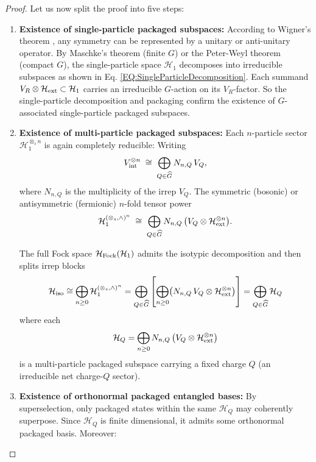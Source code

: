 \documentclass[12pt,a4paper]{article}
\begin{document}
\begin{proof}
	Let us now split the proof into five steps:
	
	\begin{enumerate}
		\item \textbf{Existence of single-particle packaged subspaces:}  
		According to Wigner's theorem \cite{Wigner1931}, any symmetry can be represented by a unitary or anti-unitary operator.
		By Maschke’s theorem (finite $G$) or the Peter-Weyl theorem (compact $G$), the single-particle space $\mathcal H_1$ decomposes into irreducible subspaces as shown in Eq. \eqref{EQ:SingleParticleDecomposition}.		
		Each summand $V_R \otimes \mathcal{H}_{\rm ext} \subset \mathcal H_1$ carries an irreducible $G$-action on its $V_R$-factor.
		So the single-particle decomposition and packaging confirm the existence of $G$-associated single-particle packaged subspaces.
		
		\item \textbf{Existence of multi-particle packaged subspaces:}		
		Each $n$-particle sector $\mathcal H_1^{\otimes_s n}$ is again completely reducible:
		Writing
		\[
		V_{\rm int}^{\otimes n}
		\;\cong\;
		\bigoplus_{Q\in\widehat G} N_{n,Q}\,V_Q,
		\]
		where $N_{n,Q}$ is the multiplicity of the irrep $V_Q$.
		The symmetric (bosonic) or antisymmetric (fermionic) $n$-fold tensor power
		\[
		\mathcal H_1^{(\otimes_s,\wedge)^n}
		\;\cong\;
		\bigoplus_{Q\in\widehat G}
		N_{n,Q}\,\bigl(V_Q\otimes\mathcal H_{\rm ext}^{\otimes n}\bigr).
		\]	
		
		The full Fock space $\mathcal{H}_{\rm Fock}(\mathcal H_1)$ admits the isotypic decomposition and then splits irrep blocks		
		\[
		\mathcal{H}_{\rm iso}
		\cong
		\bigoplus_{n \ge 0} \mathcal H_1^{(\otimes_s, \wedge)^n}
		= \bigoplus_{Q \in \widehat G}
		\left[\bigoplus_{n \ge 0} \bigl(N_{n,Q}\,V_Q \otimes \mathcal H_{\rm ext}^{\otimes n}\bigr) \right]
		= \bigoplus_{Q \in \widehat G} \mathcal{H}_Q
		\]
		where each
		\[
		\mathcal H_Q
		=
		\bigoplus_{n\ge0}N_{n,Q}\,\bigl(V_Q\otimes\mathcal H_{\rm ext}^{\otimes n}\bigr)
		\]
		is a multi-particle packaged subspace carrying a fixed charge $Q$ (an irreducible net charge-$Q$ sector).
				
		\item \textbf{Existence of orthonormal packaged entangled bases:}		
		By superselection, only packaged states within the same $\mathcal H_Q$ may	coherently superpose.
		Since $\mathcal H_Q$ is finite dimensional, it admits some orthonormal packaged basis.
		Moreover:
		

\end{enumerate}
\end{proof}
\end{document}
